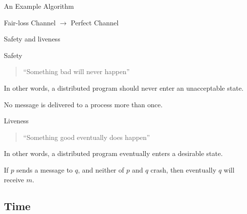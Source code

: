 \begin{frame}[shrink=16]{An Example Algorithm}

\begin{Procedure}
\caption{Fair-loss Channel $\rightarrow$ Perfect Channel} 
\end{Procedure}

\end{frame}

\begin{frame}{Safety and liveness}
\begin{block}{Safety}
\begin{quote}	
``Something bad will never happen''
\end{quote}
  In other words, a distributed program should never enter an
  unacceptable state.
  \BI
  \item No message is delivered to a process more than once.
  \EI
\end{block}

\begin{block}{Liveness}
\begin{quote}	
``Something good eventually does happen''
\end{quote}	

  In other words, a distributed program \alert{eventually} enters a desirable
  state.
  \BI
  \item If $p$ sends a message to $q$, and neither of $p$ and $q$ crash, then \alert{eventually}
$q$ will receive $m$.
  \EI
\end{block} 
\end{frame}

\subsection{Time}

